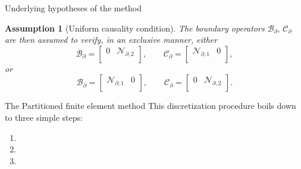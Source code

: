 \documentclass[aspectratio=169]{ISAE-Beamer}
\newtheorem{assumption}{Assumption}
\begin{document}
\begin{frame}{Underlying hypotheses of the method}
{\begin{assumption}[Uniform causality condition]
The boundary operators $\mathcal{B}_\partial, \, \mathcal{C}_\partial$ are then assumed to verify, in an exclusive manner, either
\begin{equation*}
\mathcal{B}_\partial = \begin{bmatrix}
0 & \mathcal{N}_{\partial, 2} \\
\end{bmatrix}, \qquad 
\mathcal{C}_\partial = \begin{bmatrix}
\mathcal{N}_{\partial, 1} & 0 \\
\end{bmatrix},
\end{equation*}
or 
\begin{equation*}
\mathcal{B}_\partial = \begin{bmatrix}
\mathcal{N}_{\partial, 1} & 0 \\
\end{bmatrix}, \qquad \mathcal{C}_\partial = \begin{bmatrix}
0 & \mathcal{N}_{\partial, 2} \\
\end{bmatrix}.
\end{equation*}
\end{assumption}
}

\end{frame}

\begin{frame}{The Partitioned finite element method}
This discretization procedure boils down to three simple steps:
\begin{enumerate}
	\item {} 
	\item {}
	\item {}
\end{enumerate}
\end{frame}
\end{document}
